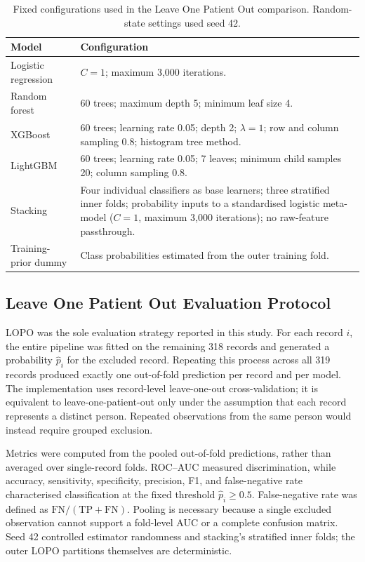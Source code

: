 \begin{table}[tbp]
\centering
\small
\caption{Fixed configurations used in the Leave One Patient Out comparison. Random-state settings used seed 42.}
\label{tab:python-parameters}
\begin{tabularx}{\linewidth}{@{}p{2.7cm}X@{}}
\toprule
Model & Configuration \\
\midrule
Logistic regression & $C=1$; maximum 3,000 iterations. \\
Random forest & 60 trees; maximum depth 5; minimum leaf size 4. \\
XGBoost & 60 trees; learning rate 0.05; depth 2; $\lambda=1$; row and column sampling 0.8; histogram tree method. \\
LightGBM & 60 trees; learning rate 0.05; 7 leaves; minimum child samples 20; column sampling 0.8. \\
Stacking & Four individual classifiers as base learners; three stratified inner folds; probability inputs to a standardised logistic meta-model ($C=1$, maximum 3,000 iterations); no raw-feature passthrough. \\
Training-prior dummy & Class probabilities estimated from the outer training fold. \\
\bottomrule
\end{tabularx}
\end{table}

\subsection{Leave One Patient Out Evaluation Protocol}
LOPO was the sole evaluation strategy reported in this study. For each record $i$, the entire pipeline was fitted on the remaining 318 records and generated a probability $\hat{p}_i$ for the excluded record. Repeating this process across all 319 records produced exactly one out-of-fold prediction per record and per model. The implementation uses record-level leave-one-out cross-validation; it is equivalent to leave-one-patient-out only under the assumption that each record represents a distinct person. Repeated observations from the same person would instead require grouped exclusion.

Metrics were computed from the pooled out-of-fold predictions, rather than averaged over single-record folds. ROC--AUC measured discrimination, while accuracy, sensitivity, specificity, precision, F1, and false-negative rate characterised classification at the fixed threshold $\hat{p}_i\geq0.5$. False-negative rate was defined as $\mathrm{FN}/(\mathrm{TP}+\mathrm{FN})$. Pooling is necessary because a single excluded observation cannot support a fold-level AUC or a complete confusion matrix. Seed 42 controlled estimator randomness and stacking's stratified inner folds; the outer LOPO partitions themselves are deterministic.

